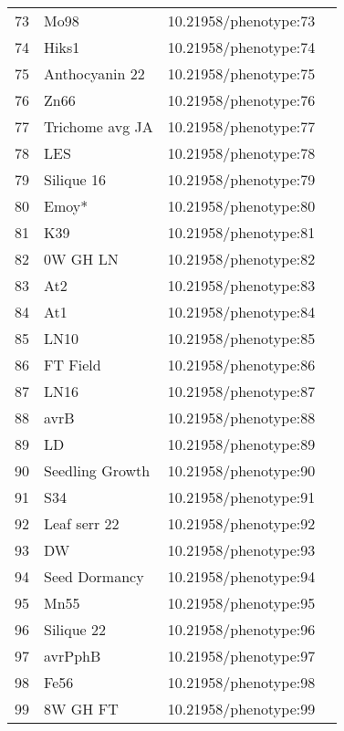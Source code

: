\begin{longtable}{p{} p{} p{} p{}}
 73 & Mo98 & 10.21958/phenotype:73 & \cite{atwell2010}\\
 74 & Hiks1 & 10.21958/phenotype:74 & \cite{atwell2010}\\
 75 & Anthocyanin 22 & 10.21958/phenotype:75 & \cite{atwell2010}\\
 76 & Zn66 & 10.21958/phenotype:76 & \cite{atwell2010}\\
 77 & Trichome avg JA & 10.21958/phenotype:77 & \cite{atwell2010}\\
 78 & LES & 10.21958/phenotype:78 & \cite{atwell2010}\\
 79 & Silique 16 & 10.21958/phenotype:79 & \cite{atwell2010}\\
 80 & Emoy* & 10.21958/phenotype:80 & \cite{atwell2010}\\
 81 & K39 & 10.21958/phenotype:81 & \cite{atwell2010}\\
 82 & 0W GH LN & 10.21958/phenotype:82 & \cite{atwell2010}\\
 83 & At2 & 10.21958/phenotype:83 & \cite{atwell2010}\\
 84 & At1 & 10.21958/phenotype:84 & \cite{atwell2010}\\
 85 & LN10 & 10.21958/phenotype:85 & \cite{atwell2010}\\
 86 & FT Field & 10.21958/phenotype:86 & \cite{atwell2010}\\
 87 & LN16 & 10.21958/phenotype:87 & \cite{atwell2010}\\
 88 & avrB & 10.21958/phenotype:88 & \cite{atwell2010}\\
 89 & LD & 10.21958/phenotype:89 & \cite{atwell2010}\\
 90 & Seedling Growth & 10.21958/phenotype:90 & \cite{atwell2010}\\
 91 & S34 & 10.21958/phenotype:91 & \cite{atwell2010}\\
 92 & Leaf serr 22 & 10.21958/phenotype:92 & \cite{atwell2010}\\
 93 & DW & 10.21958/phenotype:93 & \cite{atwell2010}\\
 94 & Seed Dormancy & 10.21958/phenotype:94 & \cite{atwell2010}\\
 95 & Mn55 & 10.21958/phenotype:95 & \cite{atwell2010}\\
 96 & Silique 22 & 10.21958/phenotype:96 & \cite{atwell2010}\\
 97 & avrPphB & 10.21958/phenotype:97 & \cite{atwell2010}\\
 98 & Fe56 & 10.21958/phenotype:98 & \cite{atwell2010}\\
 99 & 8W GH FT & 10.21958/phenotype:99 & \cite{atwell2010}\\

\end{longtable}
